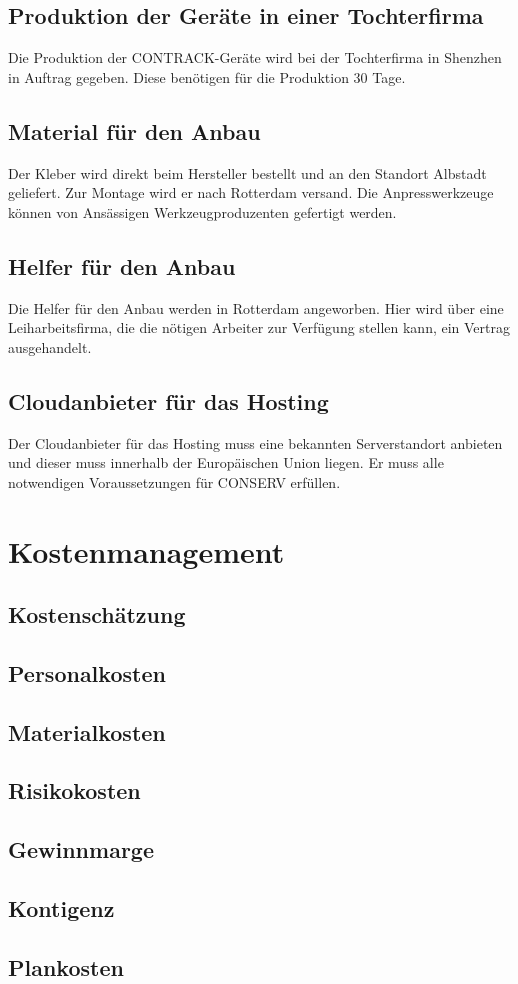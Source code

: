 \subsection{Produktion der Geräte in einer Tochterfirma}
Die Produktion der CONTRACK-Geräte wird bei der Tochterfirma in Shenzhen in Auftrag gegeben. Diese benötigen für die Produktion 30 Tage.

\subsection{Material für den Anbau}
Der Kleber wird direkt beim Hersteller bestellt und an den Standort Albstadt geliefert. Zur Montage wird er nach Rotterdam versand. Die Anpresswerkzeuge können von Ansässigen Werkzeugproduzenten gefertigt werden.

\subsection{Helfer für den Anbau}
Die Helfer für den Anbau werden in Rotterdam angeworben. Hier wird über eine Leiharbeitsfirma, die die nötigen Arbeiter zur Verfügung stellen kann, ein Vertrag ausgehandelt.

\subsection{Cloudanbieter für das Hosting}
Der Cloudanbieter für das Hosting muss eine bekannten Serverstandort anbieten und dieser muss innerhalb der Europäischen Union liegen. Er muss alle notwendigen Voraussetzungen für CONSERV erfüllen.


\section{Kostenmanagement}

\subsection{Kostenschätzung}
\subsection{Personalkosten} %
\subsection{Materialkosten}
\subsection{Risikokosten}
\subsection{Gewinnmarge}

\subsection{Kontigenz} %

\subsection{Plankosten}






